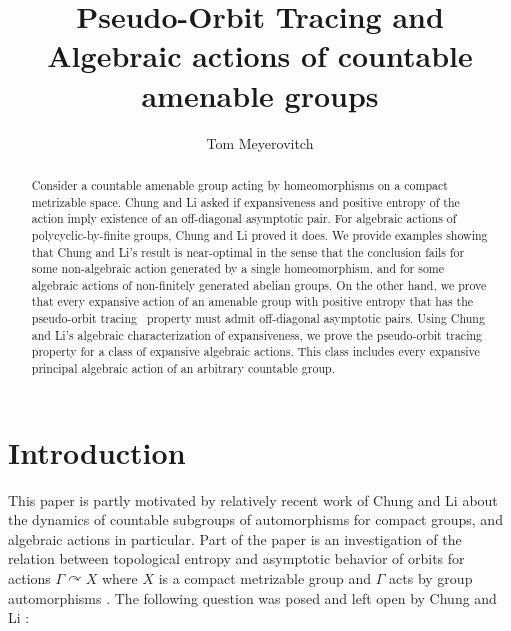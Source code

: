 \documentclass[oneside,english]{amsart}
\title{Pseudo-Orbit Tracing and Algebraic actions of countable amenable groups}
\author{Tom Meyerovitch}
\theoremstyle{definition}
\newcommand{\act}[2]{{#1} \curvearrowright {#2}}
\newcommand{\POT}{pseudo-orbit tracing}
\begin{document}
\maketitle

\begin{abstract}
Consider a countable amenable group acting by  homeomorphisms on a compact metrizable space.
Chung and Li asked if expansiveness and positive entropy of the action imply existence of an off-diagonal asymptotic pair.  For algebraic actions of polycyclic-by-finite groups, Chung and Li proved it does.
We provide examples showing that Chung and Li's result is near-optimal in the sense that  the conclusion fails for some non-algebraic action generated by a single homeomorphism, and for some algebraic actions of non-finitely generated abelian groups.
On the other hand,
we prove that every expansive action of an amenable group with positive entropy that has  the \POT~   property must admit  off-diagonal
asymptotic pairs.
 Using  Chung and Li's  algebraic characterization of expansiveness,  we prove  the \POT~   property for  a class of expansive algebraic actions.
This class includes every expansive principal algebraic action of an arbitrary countable group.

\end{abstract}

\section{Introduction}
This paper is partly motivated by relatively recent work of Chung and Li \cite{MR3314515}
about the dynamics of countable subgroups of automorphisms for compact groups, and algebraic actions in particular.
Part of the paper \cite{MR3314515} is an investigation of  the relation between topological entropy
 and asymptotic behavior of orbits for actions $\act{\Gamma}{X}$ where $X$ is a compact metrizable group and $\Gamma$ acts by group automorphisms \cite{MR3314515}.
The following question  was posed  and left open by Chung and Li  \cite{MR3314515}:
\end{document}
